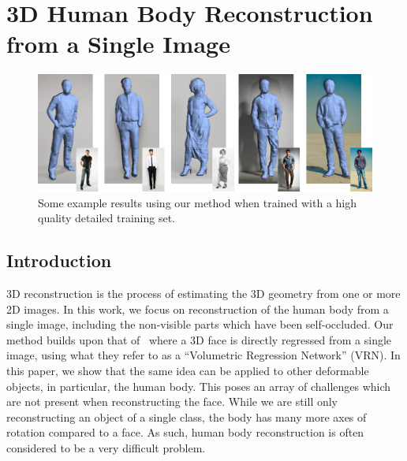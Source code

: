 \graphicspath{{chapter_humans/}}
\chapter{3D Human Body Reconstruction from a Single Image}



\begin{figure}
  \centering
  \includegraphics[width=0.8\linewidth]{img/demo.png}
  \caption{Some example results using our method when trained with a
    high quality detailed training set.}
  \label{fig:topdemo}
\end{figure}


\section{Introduction}


3D reconstruction is the process of estimating the 3D geometry from
one or more 2D images. In this work, we focus on reconstruction of the
human body from a single image, including the non-visible parts which
have been self-occluded. Our method builds upon that
of~\cite{jackson2017vrn} where a 3D face is directly regressed from a
single image, using what they refer to as a ``Volumetric Regression
Network'' (VRN). In this paper, we show that the same idea can be applied to
other deformable objects, in particular, the human body. This poses an
array of challenges which are not present when reconstructing the
face. While we are still only reconstructing an object of a single
class, the body has many more axes of rotation compared to a face. As
such, human body reconstruction is often considered to be a very
difficult problem.

